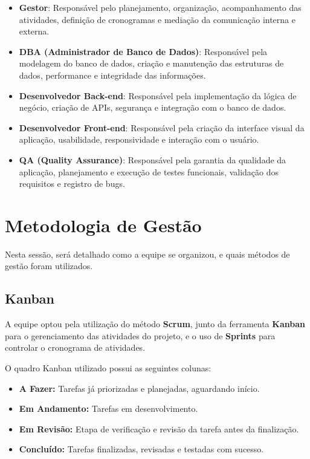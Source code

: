 \documentclass[
	12pt,				%
	openany,			%
	twoside,			%
	a4paper,			%
	english,			%
	brazil				%
	]{abntex2}
\begin{document}
\begin{itemize}
    \item \textbf{Gestor}: Responsável pelo planejamento, organização, acompanhamento das atividades, definição de cronogramas e mediação da comunicação interna e externa.
    \item \textbf{DBA (Administrador de Banco de Dados)}: Responsável pela modelagem do banco de dados, criação e manutenção das estruturas de dados, performance e integridade das informações.
    \item \textbf{Desenvolvedor Back-end}: Responsável pela implementação da lógica de negócio, criação de APIs, segurança e integração com o banco de dados.
    \item \textbf{Desenvolvedor Front-end}: Responsável pela criação da interface visual da aplicação, usabilidade, responsividade e interação com o usuário.
    \item \textbf{QA (Quality Assurance)}: Responsável pela garantia da qualidade da aplicação, planejamento e execução de testes funcionais, validação dos requisitos e registro de bugs.
\end{itemize}

\section{Metodologia de Gestão}

Nesta sessão, será detalhado como a equipe se organizou, e quais métodos de gestão foram utilizados.

\subsection{Kanban}

A equipe optou pela utilização do método \textbf{Scrum}, junto da ferramenta \textbf{Kanban} para o gerenciamento das atividades do projeto, e o uso de \textbf{Sprints} para controlar o cronograma de atividades.

O quadro Kanban utilizado possui as seguintes colunas:

\begin{itemize}
    \item \textbf{A Fazer:} Tarefas já priorizadas e planejadas, aguardando início.
    \item \textbf{Em Andamento:} Tarefas em desenvolvimento.
    \item \textbf{Em Revisão:} Etapa de verificação e revisão da tarefa antes da finalização.
    \item \textbf{Concluído:} Tarefas finalizadas, revisadas e testadas com sucesso.
\end{itemize}
\end{document}
